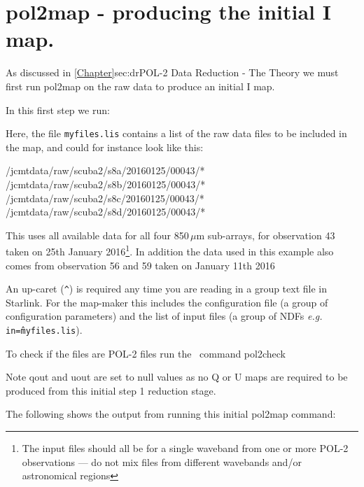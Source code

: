 \section{pol2map - producing the initial I map.}

As discussed in \cref{Chapter}{sec:dr}{POL-2 Data Reduction - The Theory} we must first run pol2map on the raw data to produce an initial I map.

In this first step we run:

\begin{terminalv}
\end{terminalv}


Here, the file \texttt{myfiles.lis} contains a list of the raw data
files to be included in the map, and could for instance look like this:

\begin{terminalv}
/jcmtdata/raw/scuba2/s8a/20160125/00043/*
/jcmtdata/raw/scuba2/s8b/20160125/00043/*
/jcmtdata/raw/scuba2/s8c/20160125/00043/*
/jcmtdata/raw/scuba2/s8d/20160125/00043/*
\end{terminalv}

This uses all available data for all four 850\,$\mu$m sub-arrays, for
observation 43 taken on 25th January 2016\footnote{The input files should all be
for a single waveband from one or more POL-2 observations --- do not mix files from
different wavebands and/or astronomical regions}. In addition the data used in this example also
comes from observation 56 and 59 taken on January 11th 2016

\begin{tip}

An up-caret (\texttt{\^}) is required any time you are reading in a group
text file in Starlink. For the map-maker this includes the configuration
file (a group of configuration parameters) and the list of input files (a
group of NDFs \emph{e.g.} \texttt{in=\^myfiles.lis}).

To check if the files are POL-2 files run the \smurf\ command pol2check
\begin{terminalv}
\end{terminalv}
\end{tip}

Note qout and uout are set to null values as no Q or U maps are required
to be produced from this initial step 1 reduction stage.

The following shows the output from running this initial pol2map command:

